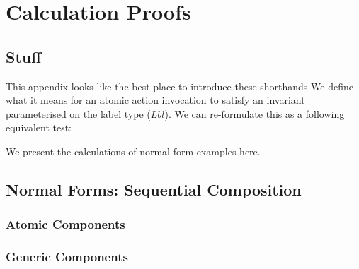 \section{Calculation Proofs}\label{sec:calc-proofs}

\subsection{Stuff}
This appendix looks like the best place to introduce these shorthands
We define what it means for an atomic action invocation
to satisfy an invariant parameterised on the label type ($Lbl$).
We can re-formulate this as a following equivalent test:

We present the calculations of normal form examples here.

\subsection{Normal Forms: Sequential Composition}

\subsubsection{Atomic Components}

\subsubsection{Generic Components}

